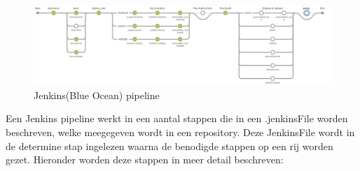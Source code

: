 \begin{figure}[H]
    \myfloatalign
    \includegraphics[width=15cm]{gfx/Screenshot 2021-08-18 Jenkins PipeLine}
    \caption{Jenkins(Blue Ocean) pipeline}
    \label{fig:JenkinsPipeLine}
\end{figure}
Een Jenkins pipeline werkt in een aantal stappen die in een .jenkinsFile worden beschreven, welke meegegeven wordt in een repository. Deze JenkinsFile wordt in de determine stap ingelezen waarna de benodigde stappen op een rij worden gezet. Hieronder worden deze stappen in meer detail beschreven:
